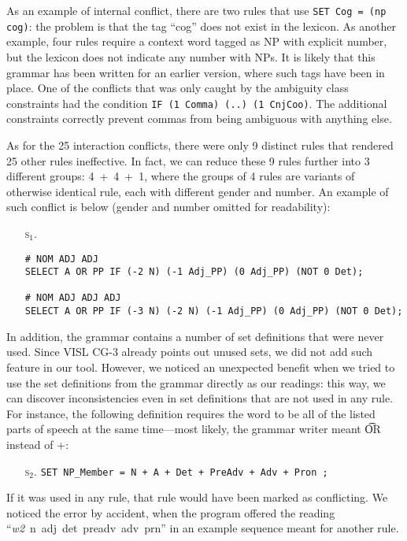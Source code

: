 {{As an example of internal conflict, there are two rules that use \texttt{SET Cog = (np cog)}: the problem is that the tag ``cog'' does not exist in the lexicon. As another example, four rules require a context word tagged as NP with explicit number, but the lexicon does not indicate any number with NPs. It is likely that this grammar has been written for an earlier version, where such tags have been in place.
One of the conflicts that was only caught by the ambiguity class constraints had the condition \texttt{IF (1 Comma) (..) (1 CnjCoo)}. The additional constraints correctly prevent commas from being ambiguous with anything else.

As for the 25 interaction conflicts, there were only 9 distinct rules that rendered 25 other rules ineffective.
In fact, we can reduce these 9 rules further into 3 different groups: 4~+~4~+~1, where the groups of 4 rules are variants of otherwise identical rule, each with different gender and number.
An example of such conflict is below (gender and number omitted for readability):

\begin{itemize}
\item[\textsc{s$_{1}$.}]
\begin{verbatim}
# NOM ADJ ADJ
SELECT A OR PP IF (-2 N) (-1 Adj_PP) (0 Adj_PP) (NOT 0 Det);

# NOM ADJ ADJ ADJ
SELECT A OR PP IF (-3 N) (-2 N) (-1 Adj_PP) (0 Adj_PP) (NOT 0 Det);
\end{verbatim}
\end{itemize}


In addition, the grammar contains a number of set definitions that were never
used. Since VISL CG-3 already points out unused sets, we did not add such
feature in our tool. However, we noticed an unexpected benefit when
we tried to use the set definitions from the grammar directly as our
readings: this way, we can discover inconsistencies even in
set definitions that are not used in any rule.
For instance, the following definition requires the word to be all of
the listed parts of speech at the same time---most likely, the grammar writer meant \t{OR} instead of +:
\begin{itemize}
\item[\textsc{s$_2$.}]
\texttt{SET NP\_Member = N + A + Det + PreAdv + Adv + Pron ;}
\end{itemize}

If it was used in any rule, that rule would have been marked as
conflicting. We noticed the error by accident, when the program
offered the reading ``\emph{w2}~n~adj~det~preadv~adv~prn''
in an example sequence meant for another rule.


}}
